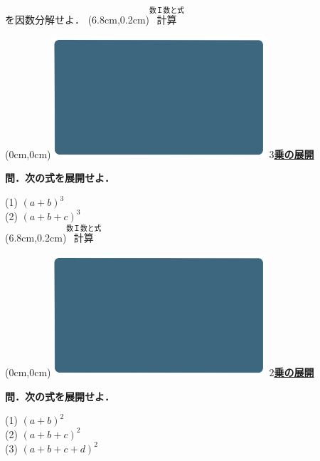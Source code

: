 \documentclass[10pt,
fleqn,
dvipdfmx,
uplatex
]{jsarticle}
\begin{document}
\Large
\vspace{0.2zw}
\hfill を因数分解せよ．
\at(6.8cm,0.2cm){\small\color{bradorange}$\overset{\text{数Ｉ数と式}}{\text{計算}}$}

\newpage

\at(0cm,0cm){\includegraphics[width=8cm,bb=0 0 1920 1080]{./youtube/thumbnails/templates/smart_background/数I数と式.jpeg}}
{\color{orange}\bf\boldmath\huge\underline{$3$乗の展開}}\vspace{0.3zw}

\large 
\bf\boldmath 問．次の式を展開せよ．

\Huge
\vspace{-0.3zw}
(1)  $\left(a+b\right)^3$\vspace{-0.2zw}\\
(2)  \HUGE $\left(a+b+c\right)^3$\\

\at(6.8cm,0.2cm){\small\color{bradorange}$\overset{\text{数Ｉ数と式}}{\text{計算}}$}

\newpage

\at(0cm,0cm){\includegraphics[width=8cm,bb=0 0 1920 1080]{./youtube/thumbnails/templates/smart_background/数I数と式.jpeg}}
{\color{orange}\bf\boldmath\huge\underline{$2$乗の展開}}\vspace{0.1zw}

\large 
\bf\boldmath 問．次の式を展開せよ．

\LARGE 
\vspace{-0.3zw}
(1)  $\left(a+b\right)^2$\\
(2)  $\left(a+b+c\right)^2$\\
(3)  $\left(a+b+c+d\right)^2$\\
\end{document}

